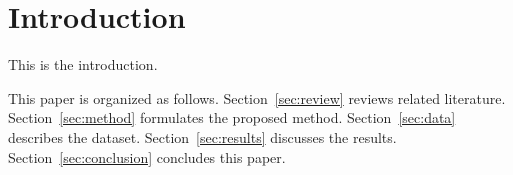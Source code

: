 \section{Introduction}\label{sec:introduction}

This is the introduction. 

This paper is organized as follows. Section~\ref{sec:review} reviews related literature. Section~\ref{sec:method} formulates the proposed method. Section~\ref{sec:data} describes the dataset. Section~\ref{sec:results} discusses the results. Section~\ref{sec:conclusion} concludes this paper.

